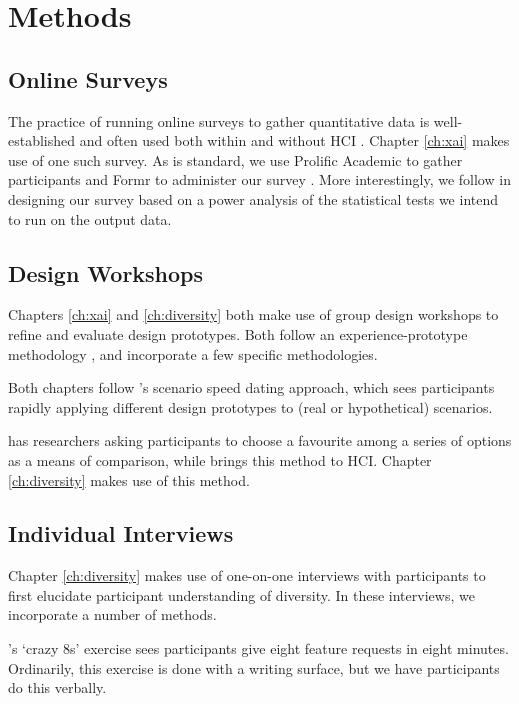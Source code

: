 \section{Methods}
\subsection{Online Surveys}
The practice of running online surveys to gather quantitative data is well-established and often used both within and without HCI \cite{zhao2023fairness,pillai_adoption_2020,krishna_disagreement_2022,mai_user_nodate,bansal_does_2021,binns_its_2018,dzindolet_role_2003,papenmeier_its_2022}. Chapter \ref{ch:xai} makes use of one such survey. As is standard, we use Prolific Academic to gather participants and Formr to administer our survey \cite{binns_its_2018,Arslan_formr_2019}. More interestingly, we follow \textcite{caldwell_power_nodate} in designing our survey based on a power analysis of the statistical tests we intend to run on the output data.

\subsection{Design Workshops}
Chapters \ref{ch:xai} and \ref{ch:diversity} both make use of group design workshops to refine and evaluate design prototypes. Both follow an experience-prototype methodology \cite{Buchenau_Suri_2000}, and incorporate a few specific methodologies.

Both chapters follow \textcite{Zimmerman_Forlizzi_2017}'s scenario speed dating approach, which sees participants rapidly applying different design prototypes to (real or hypothetical) scenarios.

\textcite{Gatian_1994} has researchers asking participants to choose a favourite among a series of options as a means of comparison, while \textcite{Griffiths_Johnson_Hartley_2007} brings this method to HCI. Chapter \ref{ch:diversity} makes use of this method.

\subsection{Individual Interviews}
Chapter \ref{ch:diversity} makes use of one-on-one interviews with participants to first elucidate participant understanding of diversity. In these interviews, we incorporate a number of methods.

\textcite{Knapp_Zeratzky_Kowitz_2016}'s `crazy 8s' exercise sees participants give eight feature requests in eight minutes. Ordinarily, this exercise is done with a writing surface, but we have participants do this verbally.

